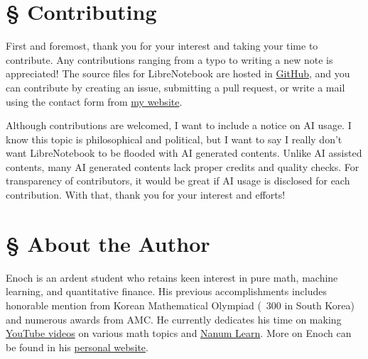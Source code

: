 \documentclass[../main.tex]{subfiles}
\begin{document}
\section*{\S\! Contributing}

First and foremost, thank you for your interest and taking your time
to contribute. Any contributions ranging from a typo to writing a new
note is appreciated! The source files for LibreNotebook are hosted
in \href{https://github.com/enochyu-official/LibreNotebook}{GitHub},
and you can contribute by creating an issue, submitting a pull
request, or write a mail using the contact form from
\href{https://enochyu.com#contact}{my website}.

Although contributions are welcomed, I want to include a notice on
AI usage. I know this topic is philosophical and political,
but I want to say I really don't want LibreNotebook to be flooded with
AI generated contents. Unlike AI assisted contents, many AI generated
contents lack proper credits and quality checks. For transparency of
contributors, it would be great if AI usage is disclosed for each
contribution. With that, thank you for your interest and efforts!

\section*{\S\! About the Author}

Enoch is an ardent student who retains keen interest in pure math,
machine learning, and quantitative finance. His previous
accomplishments includes honorable mention from Korean Mathematical
Olympiad (~300 in South Korea) and numerous awards from AMC.
He currently dedicates his time on making
\href{https://www.youtube.com/@enochyu_official}{YouTube videos}
on various math topics and
\href{https://nanumlearn.enochyu.com}{Nanum Learn}. More on Enoch can
be found in his \href{https://enochyu.com}{personal website}.
\end{document}
